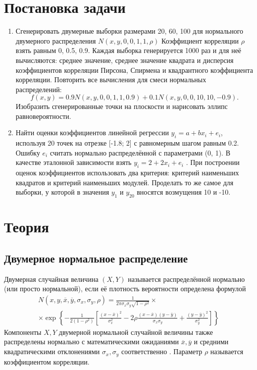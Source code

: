 \documentclass[12pt]{article}
\begin{document}
\section{Постановка задачи}
\begin{enumerate}
    \item Сгенерировать двумерные выборки размерами 20, 60, 100 для нормального двумерного распределения $N(x,y,0,0,1,1,\rho)$ Коэффициент корреляции $\rho$ взять равным 0, 0.5, 0.9. Каждая выборка генерируется 1000 раз и для неё вычисляются: среднее значение, среднее значение квадрата и дисперсия коэффициентов корреляции Пирсона, Спирмена и квадрантного коэффициента корреляции. Повторить все вычисления для смеси нормальных распределений:
    \begin{equation}
        f(x,y) = 0.9N(x,y,0,0,1,1,0.9) + 0.1N(x,y,0,0,10,10,−0.9).
        \label{mix}
    \end{equation}
    Изобразить сгенерированные точки на плоскости и нарисовать эллипс
    равновероятности.
    \item Найти оценки коэффициентов линейной регрессии $y_i = a + bx_i + e_i$, используя 20 точек на отрезке [-1.8; 2] с равномерным шагом равным 0.2. Ошибку $e_i$ считать нормально распределённой с параметрами (0, 1). В качестве эталонной зависимости взять $y_i = 2 + 2x_i + e_i$ . При построении оценок коэффициентов использовать два критерия: критерий наименьших квадратов и критерий наименьших модулей. Проделать то же самое для выборки, у которой в значения $y_1$ и $y_20$ вносятся возмущения 10 и -10.
\end{enumerate}

\newpage

\section{Теория}

\subsection{Двумерное нормальное распределение}
Двумерная случайная величина $(X, Y)$ называется распределённой нормально (или просто нормальной), если её плотность вероятности определена формулой
\begin{multline}
    N(x, y, \overline{x}, \overline{y}, \sigma_x, \sigma_y, \rho) = \frac{1}{2\pi\sigma_x\sigma_y\sqrt{1 - \rho^2}} \times\\
    \times \exp\left\{ -\frac{1}{2(1 - \rho^2)} \left[ \frac{(x - \overline{x})^2}{\sigma_x^2} - 2\rho\frac{(x - \overline{x})(y - \overline{y})}{\sigma_x\sigma_y} + \frac{(y - \overline{y})^2}{\sigma_y^2}\right] \right\}
    \label{normal2}
\end{multline}
Компоненты $X, Y$ двумерной нормальной случайной величины также распределены нормально с математическими ожиданиями $\overline{x}, \overline{y}$ и средними квадратическими отклонениями $\sigma_x, \sigma_y$ соответственно \cite{theory}. Параметр $\rho$ называется коэффициентом корреляции.
\end{document}
